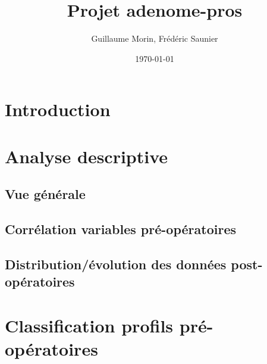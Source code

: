 \documentclass[12pt]{article}
\title{Projet  adenome-pros}
\author{Guillaume Morin, Frédéric Saunier}
\date{\today}
\begin{document}
\maketitle
\tableofcontents
\newpage

\listoffigures
\newpage


\section{Introduction}

\newpage

\section{Analyse descriptive}

\subsection{Vue générale}
  

\subsection{Corrélation variables pré-opératoires}
  

\subsection{Distribution/évolution des données post-opératoires}
  
  
  
\newpage




\section{Classification profils pré-opératoires}
\end{document}
